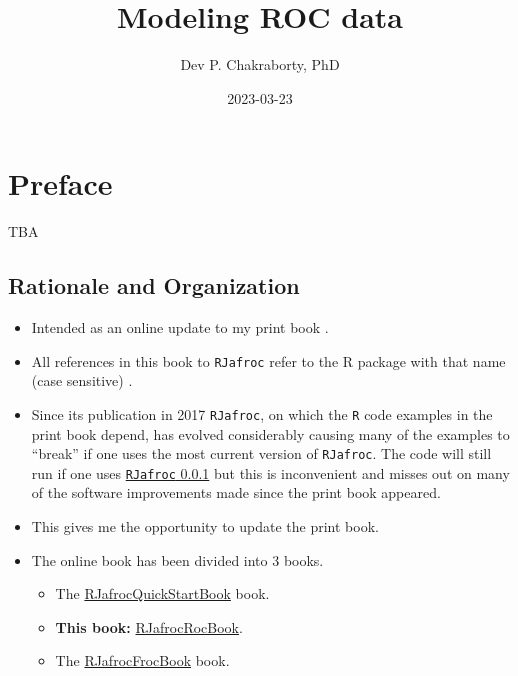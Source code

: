 \documentclass[
]{book}
\title{Modeling ROC data}
\author{Dev P. Chakraborty, PhD}
\date{2023-03-23}
\providecommand{\tightlist}{%
  \setlength{\itemsep}{0pt}\setlength{\parskip}{0pt}}
\begin{document}
\maketitle

{
\setcounter{tocdepth}{1}
\tableofcontents
}
\hypertarget{preface}{%
\chapter*{Preface}\label{preface}}

TBA

\hypertarget{rationale-and-organization}{%
\section{Rationale and Organization}\label{rationale-and-organization}}

\begin{itemize}
\tightlist
\item
  Intended as an online update to my print book \citep{chakraborty2017observer}.
\item
  All references in this book to \texttt{RJafroc} refer to the R package with that name (case sensitive) \citep{R-RJafroc}.
\item
  Since its publication in 2017 \texttt{RJafroc}, on which the \texttt{R} code examples in the print book depend, has evolved considerably causing many of the examples to ``break'' if one uses the most current version of \texttt{RJafroc}. The code will still run if one uses \href{https://cran.r-project.org/src/contrib/Archive/RJafroc/}{\texttt{RJafroc} 0.0.1} but this is inconvenient and misses out on many of the software improvements made since the print book appeared.
\item
  This gives me the opportunity to update the print book.
\item
  The online book has been divided into 3 books.

  \begin{itemize}
  \tightlist
  \item
    The \href{https://dpc10ster.github.io/RJafrocQuickStart/}{RJafrocQuickStartBook} book.
  \item
    \textbf{This book:} \href{https://dpc10ster.github.io/RJafrocRocBook/}{RJafrocRocBook}.
  \item
    The \href{https://dpc10ster.github.io/RJafrocFrocBook/}{RJafrocFrocBook} book.
  \end{itemize}
\end{itemize}
\end{document}
